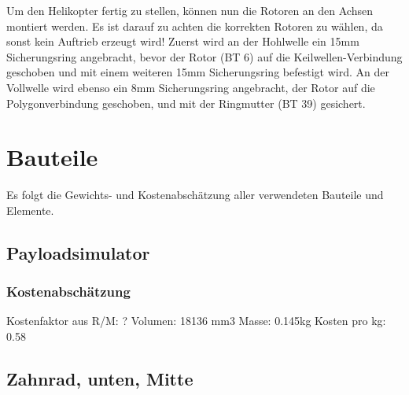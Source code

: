 \documentclass[10pt, a4paper]{article}
\begin{document}
Um den Helikopter fertig zu stellen, können nun die Rotoren an den Achsen montiert werden. Es ist darauf zu achten die korrekten Rotoren zu wählen, da sonst kein Auftrieb erzeugt wird! Zuerst wird an der Hohlwelle ein 15mm Sicherungsring angebracht, bevor der Rotor (BT 6) auf die Keilwellen-Verbindung geschoben und mit einem weiteren 15mm Sicherungsring befestigt wird. An der Vollwelle wird ebenso ein 8mm Sicherungsring angebracht, der Rotor auf die Polygonverbindung geschoben, und mit der Ringmutter (BT 39) gesichert.
\vspace{-15pt}
\begin{flushright}
    \begin{minipage}{0.45\textwidth}
      \vspace{-20pt}
    \end{minipage}
\end{flushright}

\newpage
\section{Bauteile}
Es folgt die Gewichts- und Kostenabschätzung aller verwendeten Bauteile und Elemente.

\subsection{Payloadsimulator}
\begin{figure}[h]
  \centering
  \vspace{-10pt}
\end{figure}
\subsubsection{Kostenabschätzung}
Kostenfaktor aus R/M: ?
Volumen: 18136 mm3
Masse: 0.145kg
Kosten pro kg: 0.58

\newpage
\subsection{Zahnrad, unten, Mitte}
\begin{figure}[h]
  \centering
  \vspace{-10pt}
\end{figure}
\end{document}
